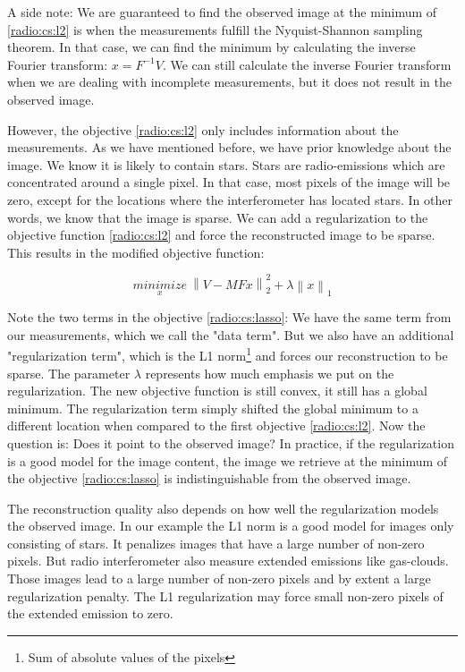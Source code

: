 A side note: We are guaranteed to find the observed image at the minimum of \eqref{radio:cs:l2} is when the measurements fulfill the Nyquist-Shannon sampling theorem. In that case, we can find the minimum by calculating the inverse Fourier transform: $x = F^{-1}V$. We can still calculate the inverse Fourier transform when we are dealing with incomplete measurements, but it does not result in the observed image.

However, the objective \eqref{radio:cs:l2} only includes information about the measurements. As we have mentioned before, we have prior knowledge about the image. We know it is likely to contain stars. Stars are radio-emissions which are concentrated around a single pixel. In that case, most pixels of the image will be zero, except for the locations where the interferometer has located stars. In other words, we know that the image is sparse. We can add a regularization to the objective function \eqref{radio:cs:l2} and force the reconstructed image to be sparse. This results in the modified objective function:

\begin{equation}\label{radio:cs:lasso}
\underset{x}{minimize} \: \left \| V - MFx \right \|_2^2 + \lambda \left \| x \right \|_1
\end{equation}

Note the two terms in the objective \eqref{radio:cs:lasso}: We have the same term from our measurements, which we call the "data term". But we also have an additional "regularization term", which is the L1 norm\footnote{Sum of absolute values of the pixels} and forces our reconstruction to be sparse. The parameter $\lambda$ represents how much emphasis we put on the regularization. The new objective function is still convex, it still has a global minimum. The regularization term simply shifted the global minimum to a different location when compared to the first objective \eqref{radio:cs:l2}. Now the question is: Does it point to the observed image? In practice, if the regularization is a good model for the image content, the image we retrieve at the minimum of the objective \eqref{radio:cs:lasso} is indistinguishable from the observed image.

The reconstruction quality also depends on how well the regularization models the observed image. In our example the L1 norm is a good model for images only consisting of stars. It penalizes images that have a large number of non-zero pixels. But radio interferometer also measure extended emissions like gas-clouds. Those images lead to a large number of non-zero pixels and by extent a large regularization penalty. The L1 regularization may force small non-zero pixels of the extended emission to zero.

